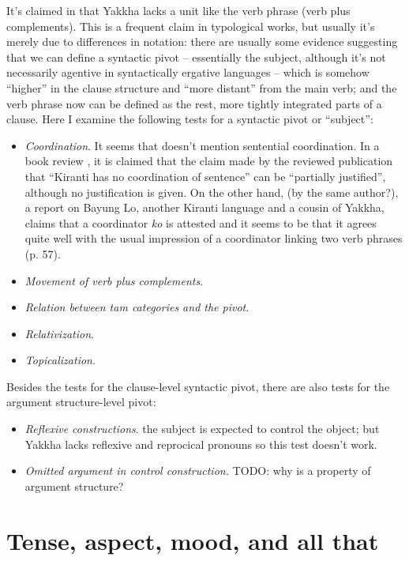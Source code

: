 \documentclass[a4paper, oneside, 12pt]{report}
\newcommand*{\citepage}[1]{p.~{#1}}
\newcommand{\form}[1]{\emph{#1}}
\begin{document}
It's claimed in \citet[\citepage{387}]{schackow2015grammar} that 
Yakkha lacks a unit like the verb phrase (verb plus complements).
This is a frequent claim in typological works,
but usually it's merely due to differences in notation:
there are usually some evidence suggesting that 
we can define a syntactic pivot 
-- essentially the subject, although it's not necessarily agentive 
in syntactically ergative languages -- 
which is somehow ``higher'' in the clause structure
and ``more distant'' from the main verb; 
and the verb phrase now can be defined as the rest, 
more tightly integrated parts of a clause.
Here I examine the following tests for a syntactic pivot or ``subject'':
\begin{itemize}
    \item \emph{Coordination}. 
    It seems that \citet{schackow2015grammar} doesn't mention sentential coordination.
    In a book review \citep{rapacha2005structure}, 
    it is claimed that the claim made by the reviewed publication 
    that ``Kiranti has no coordination of sentence'' can be ``partially justified'', 
    although no justification is given.
    On the other hand, \citet{rapacha2008kiranti} 
    (by the same author?), a report on Bayung Lo, 
    another Kiranti language and a cousin of Yakkha, 
    claims that a coordinator \form{ko} is attested 
    and it seems to be that it agrees quite well with 
    the usual impression of a coordinator linking two verb phrases (p. 57).
    \item \emph{Movement of verb plus complements}.
    \item \emph{Relation between \ac{tam} categories and the pivot}.
    \item \emph{Relativization}. 
    \item \emph{Topicalization}.
\end{itemize}

Besides the tests for the clause-level syntactic pivot, 
there are also tests for the argument structure-level pivot:
\begin{itemize}
    \item \emph{Reflexive constructions}. the subject is expected to control the object; 
    but Yakkha lacks reflexive and reprocical pronouns 
    so this test doesn't work.
    \item \emph{Omitted argument in control construction.} TODO: why is a property of argument structure?
\end{itemize}


\section{Tense, aspect, mood, and all that}
\end{document}
